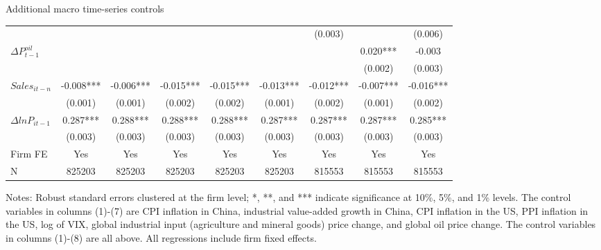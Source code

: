 \documentclass[10pt]{beamer}
\begin{document}
\begin{frame}{Additional macro time-series controls}
\begin{table}[htbp]
{\begin{threeparttable}
\begin{tabular}{lcccccccc}
                  &       &       &       &       &       & (0.003) &       & (0.006) \\
            $\Delta P^{oil}_{t-1}$ &       &       &       &       &       &       & 0.020*** & -0.003 \\
                  &       &       &       &       &       &       & (0.002) & (0.003) \\
            $Sales_{it-n}$ & -0.008*** & -0.006*** & -0.015*** & -0.015*** & -0.013*** & -0.012*** & -0.007*** & -0.016*** \\
                  & (0.001) & (0.001) & (0.002) & (0.002) & (0.001) & (0.002) & (0.001) & (0.002) \\
            $\Delta ln P_{it-1}$ & 0.287*** & 0.288*** & 0.288*** & 0.288*** & 0.287*** & 0.287*** & 0.287*** & 0.285*** \\
                  & (0.003) & (0.003) & (0.003) & (0.003) & (0.003) & (0.003) & (0.003) & (0.003) \\
            \midrule
            Firm FE & Yes   & Yes   & Yes   & Yes   & Yes   & Yes   & Yes   & Yes \\
            N     & 825203 & 825203 & 825203 & 825203 & 825203 & 815553 & 815553 & 815553 \\
            \bottomrule
        \end{tabular}%
        \begin{tablenotes}
            \footnotesize
            \item Notes: Robust standard errors clustered at the firm level;  *, **, and *** indicate significance at 10\%, 5\%, and 1\% levels. The control variables in columns (1)-(7) are CPI inflation in China, industrial value-added growth in China, CPI inflation in the US, PPI inflation in the US, log of VIX, global industrial input (agriculture and mineral goods) price change, and global oil price change. The control variables in columns (1)-(8) are all above. All regressions include firm fixed effects.
        \end{tablenotes}
        \end{threeparttable}
        }
    \end{table}
    \hyperlink{robustness_other}{}
\end{frame}
\end{document}
